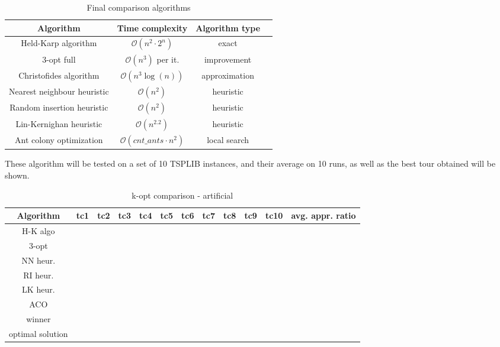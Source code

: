 \documentclass[12pt,twoside,notitlepage]{report}
\begin{document}
\begin{table}[h!]
\centering
\begin{tabular}{||c | c | c | c||} 
 \hline
 Algorithm & Time complexity & Algorithm type \\ [0.5ex] 
 \hline\hline
 Held-Karp algorithm & $\mathcal{O}(n^2 \cdot 2^n)$ & exact \\
 $3$-opt full & $\mathcal{O}(n^3)$ per it. & improvement \\
 Christofides algorithm & $\mathcal{O}(n^3 \log(n))$ & approximation \\
 Nearest neighbour heuristic & $\mathcal{O}(n^2) $ & heuristic \\
 Random insertion heuristic & $\mathcal{O}(n^2)$ & heuristic \\
 Lin-Kernighan heuristic & $\mathcal{O}(n^2.2)$ & heuristic \\
 Ant colony optimization & $\mathcal{O}(cnt\_ants \cdot n^2)$ & local search \\
 \hline
\end{tabular}
\caption{Final comparison algorithms}
\label{table:5}
\end{table}

These algorithm will be tested on a set of 10 TSPLIB instances, and their average on 10 runs, as well as the best tour obtained will be shown.

\begin{table}[h!]
\centering
\begin{tabular}{||c || c | c | c | c | c | c | c | c | c | c | c||} 
 \hline
 Algorithm & tc1 & tc2 & tc3 & tc4 & tc5 & tc6 & tc7 & tc8 & tc9 & tc10 & avg. appr. ratio\\ [0.5ex] 
 \hline\hline
 H-K algo & & & & & & & & & & & \\
 $3$-opt & & & & & & & & & & & \\
 NN heur. & & & & & & & & & & & \\
 RI heur. & & & & & & & & & & & \\
 LK heur. & & & & & & & & & & & \\
 ACO  & & & & & & & & & & & \\
 \hline\hline
 winner & & & & & & & & & & & \\
 \hline\hline
 optimal solution & & & & & & & & & & & \\
 \hline
\end{tabular}
\caption{k-opt comparison - artificial}
\label{comparison:7}
\end{table}

\cleardoublepage
\end{document}
